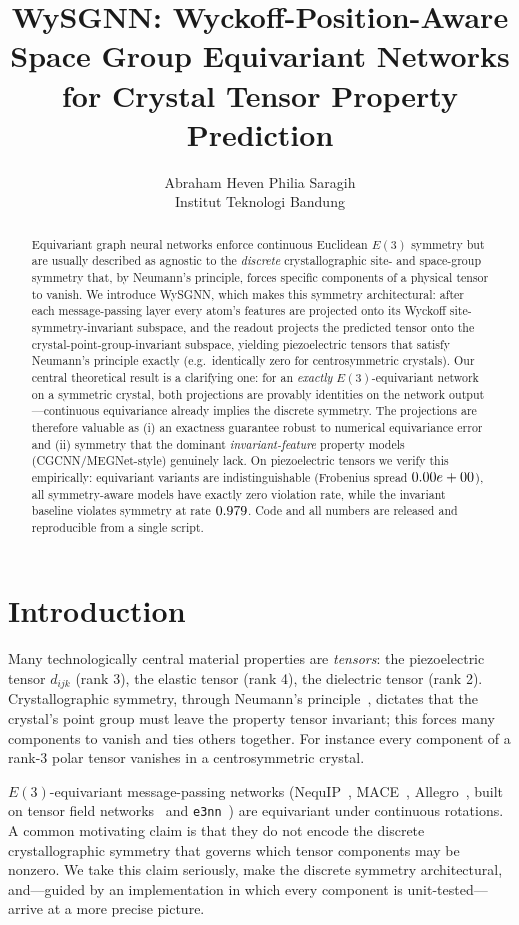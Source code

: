 \documentclass[11pt]{article}
\title{WySGNN: Wyckoff-Position-Aware Space Group Equivariant Networks\\ for Crystal Tensor Property Prediction}
\author{Abraham Heven Philia Saragih \\ Institut Teknologi Bandung}
\date{}
\begin{document}
\maketitle

\begin{abstract}
Equivariant graph neural networks enforce continuous Euclidean $E(3)$ symmetry
but are usually described as agnostic to the \emph{discrete} crystallographic
site- and space-group symmetry that, by Neumann's principle, forces specific
components of a physical tensor to vanish. We introduce WySGNN, which makes this
symmetry architectural: after each message-passing layer every atom's features
are projected onto its Wyckoff site-symmetry-invariant subspace, and the readout
projects the predicted tensor onto the crystal-point-group-invariant subspace,
yielding piezoelectric tensors that satisfy Neumann's principle exactly (e.g.\
identically zero for centrosymmetric crystals). Our central theoretical result
is a clarifying one: for an \emph{exactly} $E(3)$-equivariant network on a
symmetric crystal, both projections are provably identities on the network
output---continuous equivariance already implies the discrete symmetry. The
projections are therefore valuable as (i) an exactness guarantee robust to
numerical equivariance error and (ii) symmetry that the dominant
\emph{invariant-feature} property models (CGCNN/MEGNet-style) genuinely lack. On
piezoelectric tensors we verify this empirically: equivariant variants are
indistinguishable (Frobenius spread $0.00e+00$), all symmetry-aware models have
exactly zero violation rate, while the invariant baseline violates symmetry at
rate $0.979$. Code and all numbers are released and reproducible from a single
script.
\end{abstract}

\section{Introduction}
Many technologically central material properties are \emph{tensors}: the
piezoelectric tensor $d_{ijk}$ (rank 3), the elastic tensor (rank 4), the
dielectric tensor (rank 2). Crystallographic symmetry, through Neumann's
principle~\cite{nye1985}, dictates that the crystal's point group must leave the
property tensor invariant; this forces many components to vanish and ties others
together. For instance every component of a rank-3 polar tensor vanishes in a
centrosymmetric crystal.

$E(3)$-equivariant message-passing networks (NequIP~\cite{nequip2022},
MACE~\cite{mace2022}, Allegro~\cite{allegro2023}, built on tensor field
networks~\cite{tfn2018} and \texttt{e3nn}~\cite{e3nn2022}) are equivariant under
continuous rotations. A common motivating claim is that they do not encode the
discrete crystallographic symmetry that governs which tensor components may be
nonzero. We take this claim seriously, make the discrete symmetry architectural,
and---guided by an implementation in which every component is unit-tested---arrive
at a more precise picture.
\end{document}
